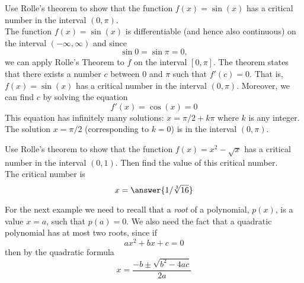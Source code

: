 \documentclass[handout]{ximera}
\begin{document}
\begin{example} [example 1] Use Rolle's theorem to show that the function $f(x) = \sin(x)$ has a critical number in the interval $(0, \pi)$.\\
The function $f(x) = \sin(x)$ is differentiable (and hence also continuous) on the interval $(-\infty, \infty)$ and since
\[
\sin 0 = \sin \pi = 0,
\]
we can apply Rolle's Theorem to $f$ on the interval $[0, \pi]$. The theorem states that there exists a number $c$ between $0$ and $\pi$ such that 
$f'(c) = 0$. That is, $f(x) = \sin(x)$ has a critical number in the interval $(0, \pi)$.
Moreover, we can find $c$ by solving the equation
\[
f'(x) = \cos(x) = 0
\]
This equation has infinitely many solutions: $x = \pi/2 + k\pi$ where $k$ is any integer.
The solution $x = \pi/2$ (corresponding to $k = 0$) is in the interval $(0, \pi)$.
\end{example}

\begin{problem} [problem 1] 
Use Rolle's theorem to show that the function $f(x) = x^2 - \sqrt x$ has a critical number in the interval $(0, 1)$.
Then find the value of this critical number.\\
The critical number is 
\[ 
x = \answer{1/\sqrt[3]{16}}
\]
\end{problem} 

For the next example we need to recall that a {\it root} of a polynomial, $p(x)$, is a value $x = a$, such that $p(a) = 0$.
We also need the fact that a quadratic polynomial has at most two roots, since if
\[
ax^2 + bx + c = 0
\]
then by the quadratic formula
\[
x = \frac{-b \pm \sqrt{b^2 - 4ac}}{2a}
\]
\end{document}
